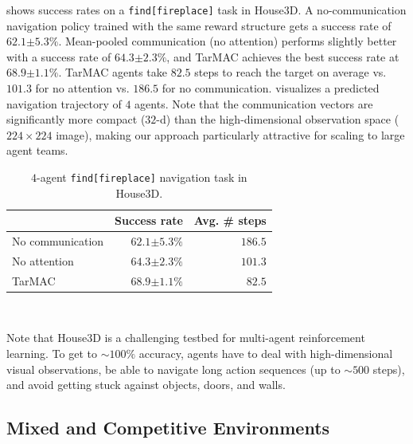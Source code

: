  shows success rates on a \texttt{find[fireplace]} task
in House3D. A no-communication navigation policy trained with the same
reward structure gets a success rate of $62.1${\scriptsize $\pm 5.3\%$}.
Mean-pooled communication (no attention) performs slightly better with a
success rate of $64.3${\scriptsize $\pm 2.3\%$}, and TarMAC
achieves the best success rate at $68.9${\scriptsize $\pm 1.1\%$}.
TarMAC agents take $82.5$ steps to reach the target on average vs. $101.3$
for no attention vs. $186.5$ for no communication.
 visualizes a predicted navigation trajectory of $4$ agents.
Note that the communication vectors are significantly more compact ($32$-d)
than the high-dimensional observation space ($224 \times 224$ image),
making our approach particularly attractive for scaling to large agent teams.

\vspace{10pt}
\begin{table}[h]
\centering
\begin{tabular}{lrr}
\toprule
    & \multicolumn{1}{c}{Success rate} & \multicolumn{1}{c}{Avg. \# steps}    \\ \midrule
    No communication
        & $62.1${\scriptsize $\pm 5.3\%$}
        & $186.5$  \\[0.05in]
    No attention
        & $64.3${\scriptsize $\pm 2.3\%$}
        & $101.3$ \\[0.05in]
    TarMAC
        & $\mathbf{68.9}${\scriptsize $\pm 1.1\%$}
        & $\mathbf{82.5}$  \\ \bottomrule
\end{tabular} \\[0.09in]
\caption{$4$-agent \texttt{find[fireplace]} navigation task in House3D.}
\label{table:house3d}
\end{table}

Note that House3D is a challenging testbed for multi-agent reinforcement
learning. To get to $\sim$$100\%$ accuracy, agents have to deal with high-dimensional
visual observations, be able to navigate long action sequences (up to $\sim$$500$ steps),
and avoid getting stuck against objects, doors, and walls.

\vspace{-5pt}
\subsection{Mixed and Competitive Environments}
\label{sec:competitive}

